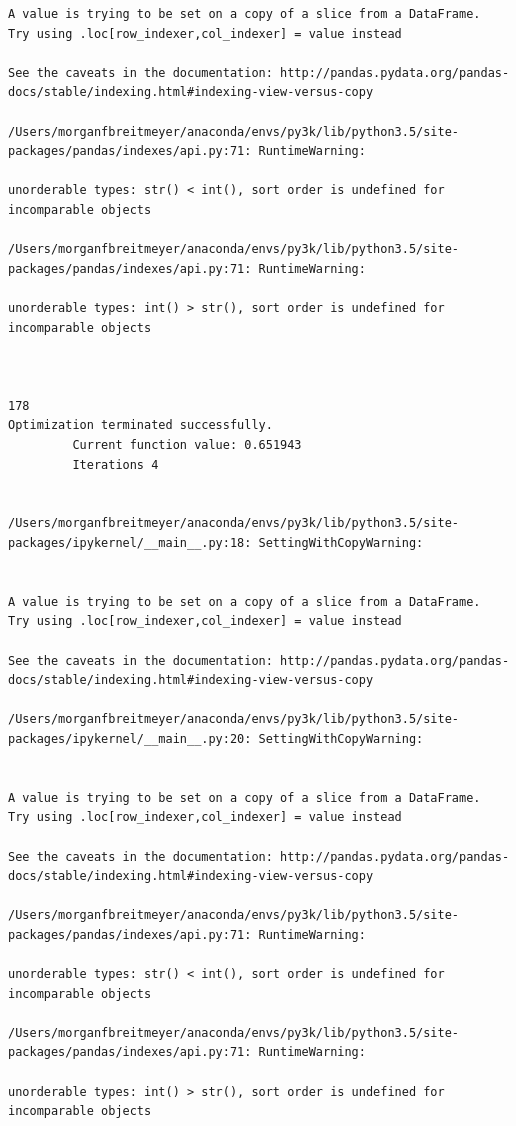 \begin{lstlisting}
A value is trying to be set on a copy of a slice from a DataFrame.
Try using .loc[row_indexer,col_indexer] = value instead

See the caveats in the documentation: http://pandas.pydata.org/pandas-docs/stable/indexing.html#indexing-view-versus-copy

/Users/morganfbreitmeyer/anaconda/envs/py3k/lib/python3.5/site-packages/pandas/indexes/api.py:71: RuntimeWarning:

unorderable types: str() < int(), sort order is undefined for incomparable objects

/Users/morganfbreitmeyer/anaconda/envs/py3k/lib/python3.5/site-packages/pandas/indexes/api.py:71: RuntimeWarning:

unorderable types: int() > str(), sort order is undefined for incomparable objects



178
Optimization terminated successfully.
         Current function value: 0.651943
         Iterations 4


/Users/morganfbreitmeyer/anaconda/envs/py3k/lib/python3.5/site-packages/ipykernel/__main__.py:18: SettingWithCopyWarning:


A value is trying to be set on a copy of a slice from a DataFrame.
Try using .loc[row_indexer,col_indexer] = value instead

See the caveats in the documentation: http://pandas.pydata.org/pandas-docs/stable/indexing.html#indexing-view-versus-copy

/Users/morganfbreitmeyer/anaconda/envs/py3k/lib/python3.5/site-packages/ipykernel/__main__.py:20: SettingWithCopyWarning:


A value is trying to be set on a copy of a slice from a DataFrame.
Try using .loc[row_indexer,col_indexer] = value instead

See the caveats in the documentation: http://pandas.pydata.org/pandas-docs/stable/indexing.html#indexing-view-versus-copy

/Users/morganfbreitmeyer/anaconda/envs/py3k/lib/python3.5/site-packages/pandas/indexes/api.py:71: RuntimeWarning:

unorderable types: str() < int(), sort order is undefined for incomparable objects

/Users/morganfbreitmeyer/anaconda/envs/py3k/lib/python3.5/site-packages/pandas/indexes/api.py:71: RuntimeWarning:

unorderable types: int() > str(), sort order is undefined for incomparable objects




\end{lstlisting}
